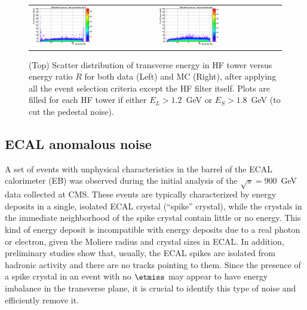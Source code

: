 \begin{itemize}

%
%
\begin{figure}[h!]
 \centering
 \begin{tabular}{ll}
  \includegraphics[width=0.5\textwidth]{plots_hcalnoise/hf_towerET_vs_ratio_DATA.eps} &
  \includegraphics[width=0.5\textwidth]{plots_hcalnoise/hf_towerET_vs_ratio_MC.eps} \\
 \end{tabular}
\caption{\small (Top) Scatter distribution of transverse energy in HF tower versus energy ratio $R$ for both data 
(Left) and MC (Right), after applying all the event selection criteria except the HF filter itself. 
Plots are filled for each HF tower if either $E_L>1.2$~GeV or $E_S>1.8$~GeV (to cut the pedestal noise).
\label{fig:hf_noise_ET_vs_R}}
\end{figure}
%
%
\end{itemize}

\subsection{ECAL anomalous noise} \label{sec:ECALNoise}

A set of events with unphysical characteristics in the barrel of the ECAL
calorimeter (EB) was observed during the initial analysis of the
$\sqrt{s}=900$~GeV data collected at CMS. These events are typically 
characterized by energy deposits in a single, isolated ECAL crystal (``spike''
crystal), while the crystals in the immediate neighborhood of the spike
crystal contain little or no energy.  
This kind of energy deposit is incompatible with energy deposits due to a real photon or electron,
given the Moliere radius and crystal sizes in ECAL. 
In addition, preliminary studies show that, usually, the ECAL 
spikes are isolated from hadronic activity and there are 
no tracks pointing to them. Since the presence
of a spike crystal in an event with no $\etmiss$ may appear to have
energy imbalance in the transverse plane, it is crucial to identify this
type of noise and efficiently remove it.

